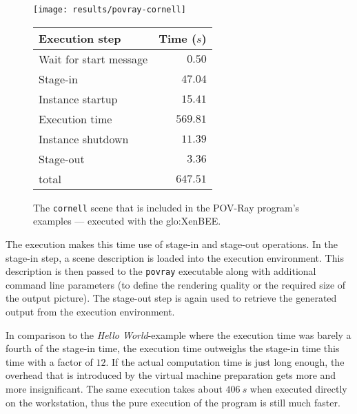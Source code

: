 \begin{figure}[ht]
  \begin{minipage}{0.48\columnwidth}%
    \centering
    \texttt{[image: results/povray-cornell]}
  \end{minipage}%
  \hfill%
  \begin{minipage}{0.48\columnwidth}%
    \begin{tabular}{@{}lr@{}}\toprule
      Execution step         &   Time ($s$) \\ \midrule %
      Wait for start message &   $   0.50 $ \\
      Stage-in               &   $  47.04 $ \\
      Instance startup       &   $  15.41 $ \\
      Execution time         &   $ 569.81 $ \\
      Instance shutdown      &   $  11.39 $ \\
      Stage-out              &   $   3.36 $ \\
      total                  &   $ 647.51 $ \\ \bottomrule
    \end{tabular}
  \end{minipage}%
  \vspace{1em}
  \caption[POV-Ray  execution result]{The  \texttt{cornell} scene  that is
    included  in the  POV-Ray  program's examples  ---  executed with  the
    \gls{glo:XenBEE}.}
  \label{fig:pov-cornell}
\end{figure}

The execution makes this time use of stage-in and stage-out operations. In
the  stage-in step,  a  scene  description is  loaded  into the  execution
environment.   This  description is  then  passed  to the  \texttt{povray}
executable along  with additional command  line parameters (\eg  to define
the rendering  quality or  the required size  of the output  picture). The
stage-out step  is again  used to retrieve  the generated output  from the
execution environment.

In comparison  to the \emph{Hello World}-example where  the execution time
was barely a fourth of the stage-in time, the execution time outweighs the
stage-in time this time with a  factor of $12$.  If the actual computation
time is just  long enough, the overhead that is  introduced by the virtual
machine preparation gets more  and more insignificant.  The same execution
takes about $406\  s$ when executed directly on  the workstation, thus the
pure execution of the program is still much faster.

